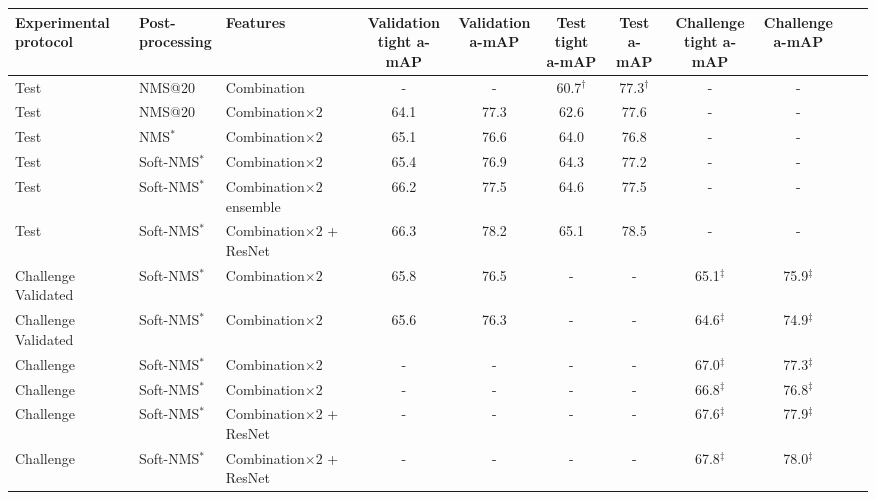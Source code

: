 \documentclass[10pt,twocolumn,letterpaper]{article}
\begin{document}
\begin{table*}
\footnotesize
\centering
  \begin{tabular}{lllcccccccc}
    \toprule
     \makecell[l]{Experimental\\protocol} & 
    \makecell[l]{Post-\\processing} & Features & 
    \makecell{Validation\\tight a-mAP} & \makecell{Validation\\a-mAP} & 
    \makecell{Test tight\\a-mAP} & \makecell{Test\\a-mAP}& 
    \makecell{Challenge\\tight a-mAP} & \makecell{Challenge\\a-mAP}\\
\midrule[2\arrayrulewidth]
    Test & NMS@20 & Combination & - & - & 60.7$^\dag$ & 77.3$^\dag$ & - & -\\
    \hline
    Test & NMS@20 & Combination$\times 2$ & 64.1 & 77.3 & 62.6 & 77.6 & - & -\\
    \hline
    Test & NMS$^*$ & Combination$\times 2$ & 65.1 & 76.6 & 64.0 & 76.8 & - & -\\
    \hline
    Test & Soft-NMS$^*$ & Combination$\times 2$ & 65.4 & 76.9 & 64.3 & 77.2 & - & -\\
    \hline
    Test & Soft-NMS$^*$ & Combination$\times 2$ ensemble & 66.2 & 77.5 & 64.6 & 77.5 & - & -\\
    \hline
    Test & Soft-NMS$^*$ & Combination$\times 2$ + ResNet & 66.3 & 78.2 & 65.1 & 78.5 & - & -\\
    \hline
    Challenge Validated & Soft-NMS$^*$ & Combination$\times 2$ & 65.8 & 76.5 & - & - & 65.1$^\ddagger$ & 75.9$^\ddagger$\\
    Challenge Validated & Soft-NMS$^*$ & Combination$\times 2$ & 65.6 & 76.3 & - & - & 64.6$^\ddagger$ & 74.9$^\ddagger$\\
    \hline
    Challenge & Soft-NMS$^*$ & Combination$\times 2$ & - & - & - & - & 67.0$^\ddagger$ & 77.3$^\ddagger$\\
    Challenge & Soft-NMS$^*$ & Combination$\times 2$ & - & - & - & - & 66.8$^\ddagger$ & 76.8$^\ddagger$\\
    \hline
    Challenge & Soft-NMS$^*$ & Combination$\times 2$ + ResNet & - & - & - & - & 67.6$^\ddagger$ & 77.9$^\ddagger$\\
    Challenge & Soft-NMS$^*$ & Combination$\times 2$ + ResNet & - & - & - & - & 67.8$^\ddagger$ & 78.0$^\ddagger$\\

\end{tabular}
\end{table*}
\end{document}

